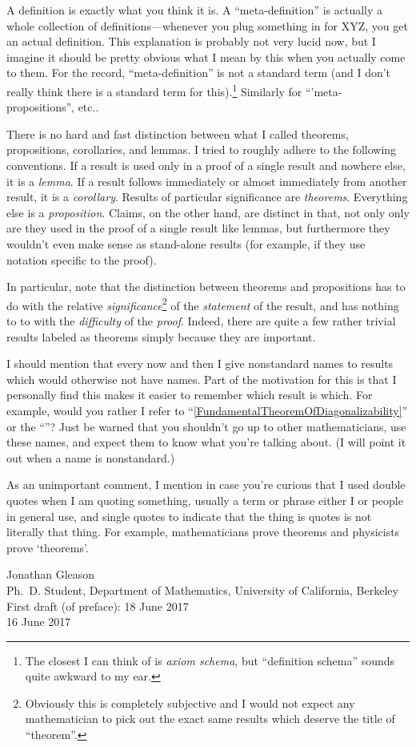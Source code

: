 A definition is exactly what you think it is.  A ``meta-definition'' is actually a whole collection of definitions---whenever you plug something in for XYZ, you get an actual definition.  This explanation is probably not very lucid now, but I imagine it should be pretty obvious what I mean by this when you actually come to them.  For the record, ``meta-definition'' is not a standard term (and I don't really think there is a standard term for this).\footnote{The closest I can think of is \emph{axiom schema}, but ``definition schema'' sounds quite awkward to my ear.}  Similarly for ``'meta-propositions'', etc..

There is no hard and fast distinction between what I called theorems, propositions, corollaries, and lemmas.  I tried to roughly adhere to the following conventions.  If a result is used only in a proof of a single result and nowhere else, it is a \emph{lemma}.  If a result follows immediately or almost immediately from another result, it is a \emph{corollary}.  Results of particular significance are \emph{theorems}.  Everything else is a \emph{proposition}.  Claims, on the other hand, are distinct in that, not only only are they used in the proof of a single result like lemmas, but furthermore they wouldn't even make sense as stand-alone results (for example, if they use notation specific to the proof).

In particular, note that the distinction between theorems and propositions has to do with the relative \emph{significance}\footnote{Obviously this is completely subjective and I would not expect any mathematician to pick out the exact same results which deserve the title of ``theorem''.} of the \emph{statement} of the result, and has nothing to to with the \emph{difficulty} of the \emph{proof}.  Indeed, there are quite a few rather trivial results labeled as theorems simply because they are important.

I should mention that every now and then I give nonstandard names to results which would otherwise not have names.  Part of the motivation for this is that I personally find this makes it easier to remember which result is which.  For example, would you rather I refer to ``\cref{FundamentalTheoremOfDiagonalizability}'' or the ``''?  Just be warned that you shouldn't go up to other mathematicians, use these names, and expect them to know what you're talking about.  (I will point it out when a name is nonstandard.)

As an unimportant comment, I mention in case you're curious that I used double quotes when I am quoting something, usually a term or phrase either I or people in general use, and single quotes to indicate that the thing is quotes is not literally that thing.  For example, mathematicians prove theorems and physicists prove `theorems'.

\blankline
\horizontalrule
\blankline

\hfill Jonathan Gleason \\
\hfill Ph.~D. Student, Department of Mathematics, University of California, Berkeley \\
\hfill First draft (of preface):  18 June 2017 \\
\hfill 16 June 2017


